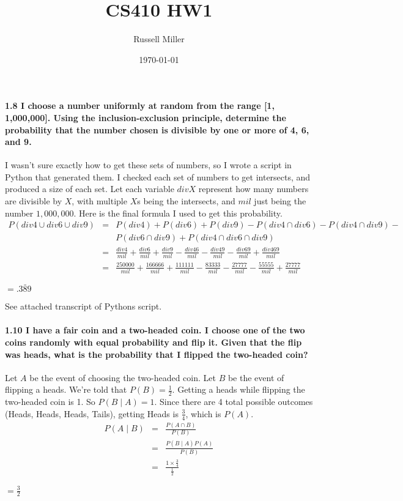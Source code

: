 \documentclass{article}
\title{CS410 HW1}
\author{Russell Miller}
\date{\today}
\begin{document}
\maketitle

\paragraph{1.8 I choose a number uniformly at random from the range [1,
1,000,000]. Using the inclusion-exclusion principle, determine the
probability that the number chosen is divisible by one or more of 4, 6, and
9.\\}
I wasn't sure exactly how to get these sets of numbers, so I wrote a
script in Python that generated them. I checked each set of numbers to get
intersects, and produced a size of each set. Let each variable $divX$
represent how many numbers are divisible by $X$, with multiple $X$s being 
the intersects, and $mil$ just being the number $1,000,000$. Here is the 
final formula I used to get this probability.
\begin{eqnarray*}
P(div4 \cup div6 \cup div9) & = & P(div4) + P(div6) + P(div9) - P(div4 \cap
  div6) - P(div4 \cap div9) - \\
      &   & P(div6 \cap div9) + P(div4 \cap div6 \cap 
  div9)\\
      & = & \frac{div4}{mil} + \frac{div6}{mil} + 
  \frac{div9}{mil} - \frac{div46}{mil} - \frac{div49}{mil} - 
  \frac{div69}{mil} + \frac{div469}{mil}\\
      & = & \frac{250000}{mil} + \frac{166666}{mil} + 
  \frac{111111}{mil} - \frac{83333}{mil} - \frac{27777}{mil} - 
  \frac{55555}{mil} + \frac{27777}{mil}
\end{eqnarray*}
\begin{center}
$\boxed{= .3\bar{8}9}$
\end{center}
{\footnotesize See attached transcript of Pythons script.}

\paragraph{1.10 I have a fair coin and a two-headed coin. I choose one of
the two coins randomly with equal probability and flip it. Given that the 
flip was heads, what is the probability that I flipped the two-headed 
coin?\\}
Let $A$ be the event of choosing the two-headed coin. Let $B$ be the event
of flipping a heads. We're told that $P(B) = \frac{1}{2}$. Getting a heads 
while flipping the two-headed coin is 1. So $P(B \mid A) = 1$. Since there
are 4 total possible outcomes (Heads, Heads, Heads, Tails), getting Heads 
is $\frac{3}{4}$, which is $P(A)$.
\begin{eqnarray*}
  P(A \mid B) & = & \frac{P(A \cap B)}{P(B)}\\
              & = & \frac{P(B \mid A)P(A)}{P(B)}\\
              & = & \frac{1 \times \frac{3}{4}}{\frac{1}{2}}
\end{eqnarray*}
\begin{center}
$\boxed{= \frac{3}{2}}$
\end{center}
\end{document}
